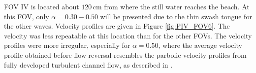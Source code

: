 \documentclass[review, authoryear]{elsarticle}
\newcommand{\cm}{\,\mbox{cm}}
\begin{document}
 FOV IV is located about $120\cm$ from where the still water reaches the beach. At this FOV, only $\alpha=0.30-0.50$ will be presented due to the thin swash tongue for the other waves. Velocity profiles are given in Figure \ref{fig:PIV_FOV6}. The velocity was less repeatable at this location than for the other FOVs. The velocity profiles were more irregular, especially for $\alpha=0.50$, where the average velocity profile obtained before flow reversal resembles the parbolic velocity profiles from fully developed turbulent channel flow, as described in \cite{white2006viscous}. %
\end{document}
